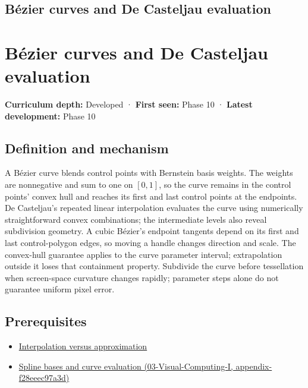 \hypertarget{appendix-ddbec701898c}{}
\section*{Bézier curves and De Casteljau evaluation}
\chapter{Bézier curves and De Casteljau evaluation}\label{appendix-ddbec701898c-buxe9zier-curves-and-de-casteljau-evaluation}

\textbf{Curriculum depth:} Developed · \textbf{First seen:} Phase 10 · \textbf{Latest development:} Phase 10

\section{Definition and mechanism}\label{appendix-ddbec701898c-definition-and-mechanism}

A Bézier curve blends control points with Bernstein basis weights. The weights are nonnegative and sum to one on \([0,1]\), so the curve remains in the control points' convex hull and reaches its first and last control points at the endpoints. De Casteljau's repeated linear interpolation evaluates the curve using numerically straightforward convex combinations; the intermediate levels also reveal subdivision geometry. A cubic Bézier's endpoint tangents depend on its first and last control-polygon edges, so moving a handle changes direction and scale. The convex-hull guarantee applies to the curve parameter interval; extrapolation outside it loses that containment property. Subdivide the curve before tessellation when screen-space curvature changes rapidly; parameter steps alone do not guarantee uniform pixel error.

\section{Prerequisites}\label{appendix-ddbec701898c-prerequisites}

\begin{itemize}
\tightlist
\item
  \hyperref[appendix-0c2a5f69851e]{Interpolation versus approximation}
\item
  \href{../03-Visual-Computing-I/main.pdf\#nameddest=appendix-f28eeec97a3d}{Spline bases and curve evaluation (03-Visual-Computing-I, appendix-f28eeec97a3d)}
\end{itemize}

